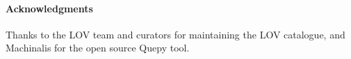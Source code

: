 \documentclass{acm}
\begin{document}
\vspace{1mm}
\paragraph{\textbf{Acknowledgments}} %
Thanks to the LOV team and curators for maintaining the LOV catalogue, and Machinalis for the open source Quepy tool. 




\balancecolumns
\end{document}
